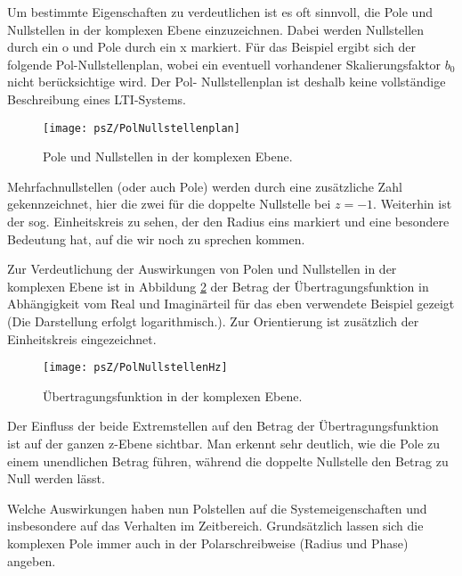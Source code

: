 Um bestimmte Eigenschaften zu verdeutlichen ist es oft sinnvoll,
die Pole und Nullstellen in der komplexen Ebene einzuzeichnen.
Dabei werden Nullstellen durch ein o und Pole durch ein x
markiert. Für das Beispiel ergibt sich der folgende
Pol-Nullstellenplan, wobei ein eventuell vorhandener Skalierungsfaktor $b_0$
nicht berücksichtige wird. Der Pol- Nullstellenplan ist deshalb keine
vollständige Beschreibung eines LTI-Systems.
\begin{figure}[H]
\begin{center}
\texttt{[image: psZ/PolNullstellenplan]}
\caption{\label{pic:bspPolnullstellenplan}Pole und Nullstellen in
der komplexen Ebene.}
\end{center}
\end{figure}
Mehrfachnullstellen (oder auch Pole) werden durch eine zusätzliche
Zahl gekennzeichnet, hier die zwei für die doppelte Nullstelle bei
$z = -1$. Weiterhin ist der sog. Einheitskreis zu sehen, der den
Radius eins markiert und eine besondere Bedeutung hat, auf die wir
noch zu sprechen kommen.

Zur Verdeutlichung der Auswirkungen von Polen und Nullstellen
in der komplexen Ebene ist in Abbildung \ref{pic:PolNullstellenAuswirkung}
der Betrag der Übertragungsfunktion in Abhängigkeit vom Real und Imaginärteil
für das eben verwendete Beispiel gezeigt (Die Darstellung erfolgt logarithmisch.).
Zur Orientierung ist zusätzlich der Einheitskreis eingezeichnet.

\begin{figure}[H]
\begin{center}
\texttt{[image: psZ/PolNullstellenHz]}
\caption{\label{pic:PolNullstellenAuswirkung}Übertragungsfunktion in der komplexen Ebene.}
\end{center}
\end{figure}

Der Einfluss der
beide Extremstellen auf den Betrag der Übertragungsfunktion ist auf der ganzen z-Ebene sichtbar.
Man erkennt sehr deutlich, wie die Pole zu einem unendlichen Betrag führen,
während die doppelte Nullstelle den Betrag zu Null werden lässt.

Welche Auswirkungen haben nun Polstellen auf die
Systemeigenschaften und insbesondere auf das Verhalten im
Zeitbereich. Grundsätzlich lassen sich die komplexen Pole immer
auch in der Polarschreibweise (Radius und Phase) angeben.


